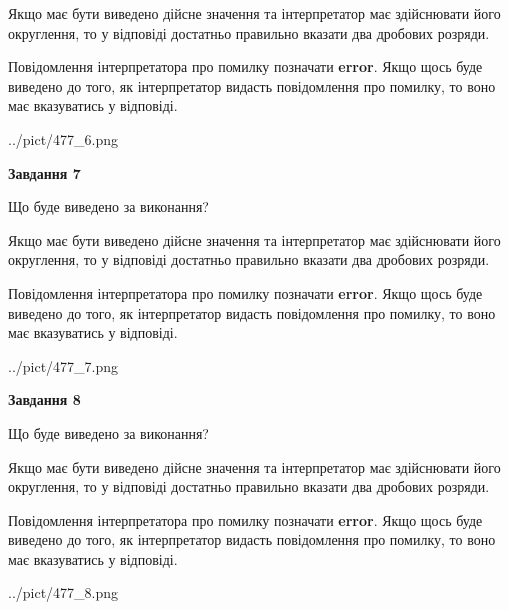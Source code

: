 \documentclass[12pt, ukrainian]{article}
\begin{document}
{\begin {Large}
Якщо має бути виведено дійсне значення та інтерпретатор має здійснювати його округлення, 
то у відповіді достатньо правильно вказати два дробових розряди.

Повідомлення інтерпретатора про помилку позначати \textbf{error}.
Якщо щось буде виведено до того, як інтерпретатор видасть повідомлення про помилку, 
то воно має вказуватись у відповіді. \par

\begin{center}
	{../pict/477_6.png}
\end{center}
\newpage

{\begin {center}\textbf{Завдання 7}\end {center}}\par
Що буде виведено за виконання? \par

Якщо має бути виведено дійсне значення та інтерпретатор має здійснювати його округлення, 
то у відповіді достатньо правильно вказати два дробових розряди.

Повідомлення інтерпретатора про помилку позначати \textbf{error}.
Якщо щось буде виведено до того, як інтерпретатор видасть повідомлення про помилку, 
то воно має вказуватись у відповіді. \par

\begin{center}
	{../pict/477_7.png}
\end{center}
\newpage

{\begin {center}\textbf{Завдання 8}\end {center}}\par
Що буде виведено за виконання? \par

Якщо має бути виведено дійсне значення та інтерпретатор має здійснювати його округлення, 
то у відповіді достатньо правильно вказати два дробових розряди.

Повідомлення інтерпретатора про помилку позначати \textbf{error}.
Якщо щось буде виведено до того, як інтерпретатор видасть повідомлення про помилку, 
то воно має вказуватись у відповіді. \par

\begin{center}
	{../pict/477_8.png}
\end{center}
\newpage


\end{Large}}
\end{document}
